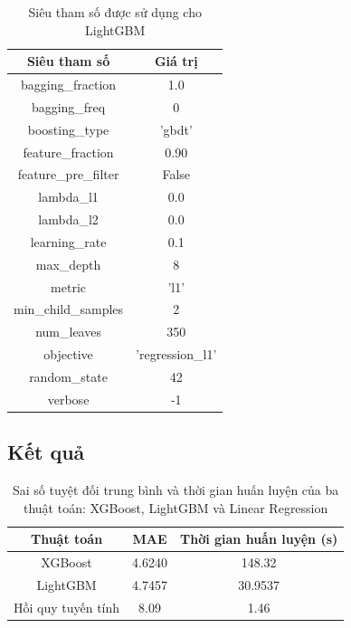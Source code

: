 \documentclass{article}
\begin{document}
\begin{center}
    \begin{table}[h!]
    \begin{tabular}{|c|c|}
        \hline
        Siêu tham số & Giá trị \\
        \hline 
        bagging\_fraction & 1.0\\
        \hline 
        bagging\_freq & 0\\
        \hline 
        boosting\_type & 'gbdt' \\
        \hline
        feature\_fraction & 0.90\\
        \hline 
        feature\_pre\_filter & False\\
        \hline 
        lambda\_l1 & 0.0\\
        \hline 
        lambda\_l2 & 0.0 \\
        \hline 
        learning\_rate & 0.1 \\
        \hline 
        max\_depth & 8\\
        \hline 
        metric & 'l1'\\ 
        \hline 
        min\_child\_samples & 2\\
        \hline
        num\_leaves & 350\\
        \hline 
        objective & 'regression\_l1'\\
        \hline 
        random\_state & 42\\ 
        \hline 
        verbose & -1\\
        \hline
    \end{tabular}
    \caption{Siêu tham số được sử dụng cho LightGBM}
    \label{tab: table-lightgbm} 
    \end{table}
\end{center}

\subsection{Kết quả}

\begin{center}
    \begin{table}[h!]
    \begin{tabular}{|c|c|c|}
        \hline
        Thuật toán & MAE & Thời gian huấn luyện (s) \\
        \hline 
        XGBoost  & 4.6240 & 148.32  \\
        \hline 
        LightGBM & 4.7457  & 30.9537 \\
        \hline 
        Hồi quy tuyến tính &  8.09 & 1.46 \\
        \hline
    \end{tabular}
    \caption{Sai số tuyệt đối trung bình và thời gian huấn luyện của ba thuật toán: XGBoost, LightGBM và Linear Regression}
    \label{tab: table-1} 
    \end{table}
\end{center}
\end{document}
